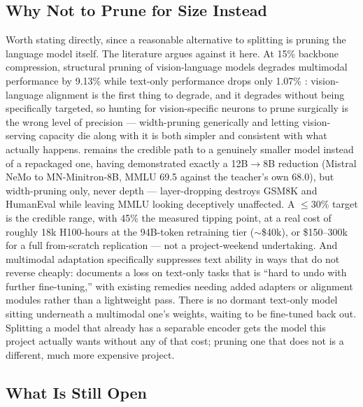 \documentclass[11pt]{article}
\begin{document}
\subsection{Why Not to Prune for Size Instead}

Worth stating directly, since a reasonable alternative to splitting is pruning the
language model itself. The literature argues against it here. At 15\% backbone
compression, structural pruning of vision-language models degrades multimodal
performance by 9.13\% while text-only performance drops only 1.07\%
\citep{lvlmpruning2026}: vision-language alignment is the first thing to degrade, and it
degrades without being specifically targeted, so hunting for vision-specific neurons to
prune surgically is the wrong level of precision --- width-pruning generically and
letting vision-serving capacity die along with it is both simpler and consistent with
what actually happens. \citet{minitron2024} remains the credible path to a genuinely
smaller model instead of a repackaged one, having demonstrated exactly a 12B$\to$8B
reduction (Mistral NeMo to MN-Minitron-8B, MMLU 69.5 against the teacher's own 68.0),
but width-pruning only, never depth --- layer-dropping destroys GSM8K and HumanEval while
leaving MMLU looking deceptively unaffected. A $\leq$30\% target is the credible range,
with 45\% the measured tipping point, at a real cost of roughly 18k H100-hours at the
94B-token retraining tier ($\sim$\$40k), or \$150--300k for a full from-scratch
replication --- not a project-weekend undertaking. And multimodal adaptation specifically
suppresses text ability in ways that do not reverse cheaply:
\citet{linguadistill2026} documents a loss on text-only tasks that is ``hard to undo
with further fine-tuning,'' with existing remedies needing added adapters or alignment
modules rather than a lightweight pass. There is no dormant text-only model sitting
underneath a multimodal one's weights, waiting to be fine-tuned back out. Splitting a
model that already has a separable encoder gets the model this project actually wants
without any of that cost; pruning one that does not is a different, much more expensive
project.

\subsection{What Is Still Open}
\end{document}
